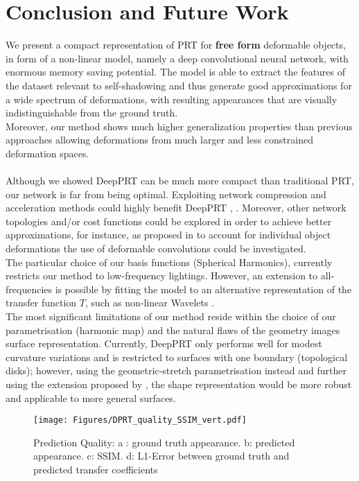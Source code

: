 \section{Conclusion and Future Work}
We present a compact representation of PRT for \textbf{free form} deformable objects, in form of a non-linear model, namely a deep convolutional neural network, with enormous memory saving potential.
 The model is able to extract the features of the dataset relevant to self-shadowing and thus generate good approximations for a wide spectrum of deformations, with resulting appearances that are visually indistinguishable from the ground truth.  
\\
Moreover, our method shows much higher generalization properties than previous approaches allowing deformations from much larger and less constrained deformation spaces.
\\
\\
Although we showed DeepPRT can be much more compact than traditional PRT, our network is far from being optimal. Exploiting network compression and acceleration methods could highly benefit DeepPRT \cite{Survey_NN_Compression}, \cite{Deep_Compression}.
Moreover, other network topologies and/or cost functions could be explored in order to achieve  better approximations, for instance, as proposed in \cite{Deformable_UNet} to account for individual object deformations the use of deformable convolutions \cite{DeformableCNN} could be investigated.
\\
The particular choice of our basis functions (Spherical Harmonics), currently restricts our method to low-frequency lightings. However, an extension to all-frequencies is possible by fitting the model to an alternative representation of the transfer function $T$, such as non-linear Wavelets \cite{AllFrequencyPRT}.
\\
The most significant limitations of our method reside within the choice of our parametrisation (harmonic map) and the natural flaws of the geometry images surface representation.  Currently, DeepPRT only performs well for modest curvature variations and is restricted to surfaces with one boundary (topological disks); however, using the geometric-stretch parametrisation instead and further using the extension proposed by \cite{Spherical_Parametrization}, the shape representation would be more robust and applicable to more general surfaces. 
\begin{figure}[H]
  \centering
    \texttt{[image: Figures/DPRT\_quality\_SSIM\_vert.pdf]}
     \caption{Prediction Quality:
     a : ground truth appearance. b: predicted appearance. c: SSIM. d: L1-Error between ground truth and predicted transfer coefficients }
     \label{Fig: DPRT_Quality}
\end{figure}